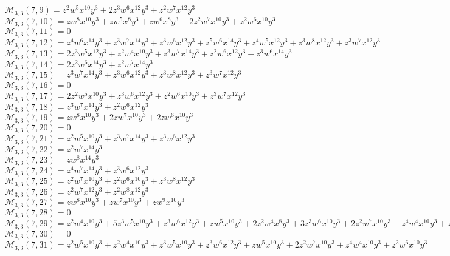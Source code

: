 \documentclass[12pt]{memoireuqam1.3}
\begin{document}
$\mathcal{M}_{3,3}(7,9)=z^2w^5x^{10}y^3+2z^3w^6x^{12}y^3+z^2w^7x^{12}y^3$\\
$\mathcal{M}_{3,3}(7,10)=zw^8x^{10}y^3+zw^5x^8y^3+zw^6x^8y^3+2z^2w^7x^{10}y^3+z^2w^6x^{10}y^3$\\
$\mathcal{M}_{3,3}(7,11)=0$\\
$\mathcal{M}_{3,3}(7,12)=z^4w^6x^{14}y^3+z^3w^7x^{14}y^3+z^3w^6x^{12}y^3+z^5w^6x^{14}y^3+z^4w^5x^{12}y^3+z^3w^8x^{12}y^3+z^3w^7x^{12}y^3$\\
$\mathcal{M}_{3,3}(7,13)=2z^3w^5x^{12}y^3+z^2w^4x^{10}y^3+z^3w^7x^{14}y^3+z^2w^6x^{12}y^3+z^3w^6x^{14}y^3$\\
$\mathcal{M}_{3,3}(7,14)=2z^2w^6x^{14}y^3+z^2w^7x^{14}y^3$\\
$\mathcal{M}_{3,3}(7,15)=z^3w^7x^{14}y^3+z^3w^6x^{12}y^3+z^3w^8x^{12}y^3+z^3w^7x^{12}y^3$\\
$\mathcal{M}_{3,3}(7,16)=0$\\
$\mathcal{M}_{3,3}(7,17)=2z^2w^5x^{10}y^3+z^3w^6x^{12}y^3+z^2w^6x^{10}y^3+z^3w^7x^{12}y^3$\\
$\mathcal{M}_{3,3}(7,18)=z^3w^7x^{14}y^3+z^2w^6x^{12}y^3$\\
$\mathcal{M}_{3,3}(7,19)=zw^8x^{10}y^3+2zw^7x^{10}y^3+2zw^6x^{10}y^3$\\
$\mathcal{M}_{3,3}(7,20)=0$\\
$\mathcal{M}_{3,3}(7,21)=z^2w^5x^{10}y^3+z^3w^7x^{14}y^3+z^3w^6x^{12}y^3$\\
$\mathcal{M}_{3,3}(7,22)=z^2w^7x^{14}y^3$\\
$\mathcal{M}_{3,3}(7,23)=zw^8x^{14}y^3$\\
$\mathcal{M}_{3,3}(7,24)=z^4w^7x^{14}y^3+z^3w^6x^{12}y^3$\\
$\mathcal{M}_{3,3}(7,25)=z^2w^7x^{10}y^3+z^2w^6x^{10}y^3+z^3w^8x^{12}y^3$\\
$\mathcal{M}_{3,3}(7,26)=z^2w^7x^{12}y^3+z^2w^8x^{12}y^3$\\
$\mathcal{M}_{3,3}(7,27)=zw^8x^{10}y^3+zw^7x^{10}y^3+zw^9x^{10}y^3$\\
$\mathcal{M}_{3,3}(7,28)=0$\\
$\mathcal{M}_{3,3}(7,29)=z^2w^4x^{10}y^3+5z^3w^5x^{10}y^3+z^3w^6x^{12}y^3+zw^5x^{10}y^3+2z^2w^4x^8y^3+3z^3w^6x^{10}y^3+2z^2w^7x^{10}y^3+z^4w^4x^{10}y^3+z^2w^5x^8y^3$\\
$\mathcal{M}_{3,3}(7,30)=0$\\
$\mathcal{M}_{3,3}(7,31)=z^2w^5x^{10}y^3+z^2w^4x^{10}y^3+z^3w^5x^{10}y^3+z^3w^6x^{12}y^3+zw^5x^{10}y^3+2z^2w^7x^{10}y^3+z^4w^4x^{10}y^3+z^2w^6x^{10}y^3$\\
\end{document}
